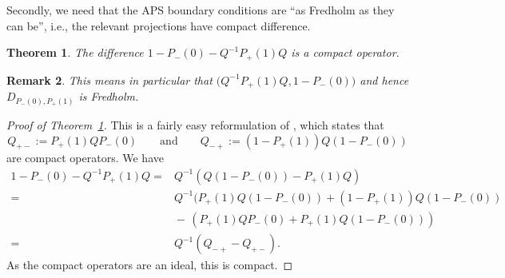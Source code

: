 \documentclass[10pt,a4paper]{amsart}
\numberwithin{equation}{section}
\newtheorem{Theorem}{Theorem}[section]
\newtheorem{Remark}[Theorem]{Remark} }
\begin{document}
	Secondly, we need that the APS boundary conditions are ``as Fredholm as they can be'', i.e., the relevant projections have compact difference.
	\begin{Theorem}	\label{APScomp}
		The difference
$1-P_-(0)-Q^{-1}P_+(1)Q$
		is a compact operator.
	\end{Theorem}
	\begin{Remark}
		This means in particular that $\bigl(Q^{-1}P_+(1)Q,1-P_-(0)\bigr)$ and hence $D_{P_-(0),P_+(1)}$ is Fredholm.
	\end{Remark}
	\begin{proof}[Proof of Theorem~\ref{APScomp}]
		This is a fairly easy reformulation of \cite[Lemma 2.6]{BSglobal}, which states that
		\[Q_{+-}:=P_+(1)QP_-(0)\qquad \text{and}\qquad Q_{-+}:=(1-P_+(1))Q(1-P_-(0))\]
		are compact operators.
		We have
		\begin{align*}
			1-P_-(0)-Q^{-1}P_+(1)Q={}&Q^{-1}(Q(1-P_-(0))-P_+(1)Q)\\
            ={}&Q^{-1}(P_+(1)Q(1-P_-(0))+(1-P_+(1))Q(1-P_-(0))\\
			&{}{-}\,(P_+(1)QP_-(0)+P_+(1)Q(1-P_-(0)))\\
			={}&Q^{-1}(Q_{-+}-Q_{+-}).
		\end{align*}
		As the compact operators are an ideal, this is compact.
	\end{proof}
\end{document}

